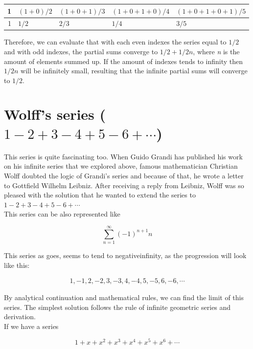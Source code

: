 \documentclass[a4paper]{article}
\begin{document}
\begin{center}
\begin{tabular}{rllll}
1 & $(1+0)/2$ & $(1+0+1)/3$ & $(1+0+1+0)/4$ & $(1+0+1+0+1)/5$\\
\hline
1 & $1/2$ & $2/3$ & $1/4$ & $3/5$\\
\end{tabular}
\end{center}

Therefore, we can evaluate that with each even indexes the series equal to $1/2$
and with odd indexes, the partial sums converge to $1/2+1/2n$, where \emph{n} is the
amount of elements summed up. If the amount of indexes tends to infinity then
$1/2n$ will be infinitely small, resulting that the infinite partial sums will
converge to $1/2$. 

\section{Wolff's series ($1-2+3-4+5-6+\cdots$)}
\label{sec-3}

This series is quite fascinating too. When Guido Grandi has published his work
on his infinite series that we explored above, famous mathematician Christian
Wolff doubted the logic of Grandi's series and because of that, he wrote a
letter to Gottfield Wilhelm Leibniz. After receiving a reply \cite{Wolff} from
Leibniz, Wolff was so pleased with the solution that he wanted to extend the
series to $1-2+3-4+5-6+\cdots$ \\

This series can be also represented like

\begin{equation*}
\sum_{n=1}^\infty (-1)^{n+1}n 
\end{equation*}

This series as goes, seems to tend to negativeinfinity, as the
progression will look like this: 

\begin{align*}
1, -1, 2, -2, 3, -3, 4, -4, 5, -5, 6, -6, \cdots
\end{align*}

By analytical continuation and mathematical rules, we can find the limit of this
series. The simplest solution follows the rule of infinite geometric series and
derivation.\\

If we have a series

\begin{equation*}
1+x+x^2+x^3+x^4+x^5+x^6+\cdots
\end{equation*}
\end{document}
